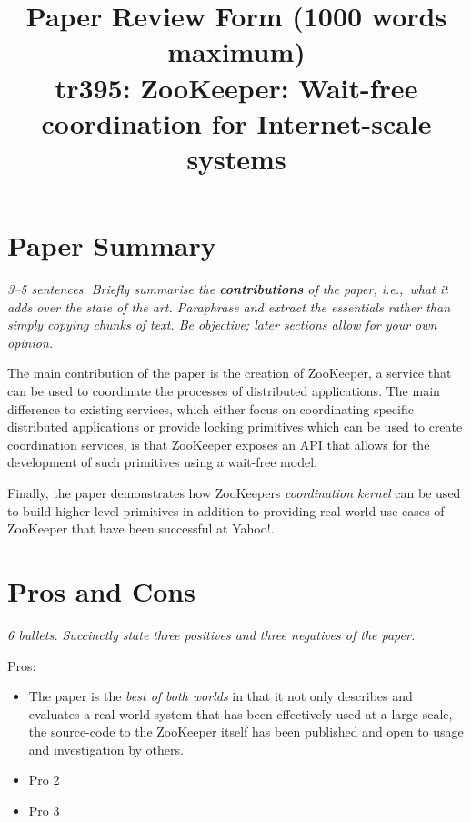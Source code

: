 \documentclass[11pt]{article}
\begin{document}

\title{Paper Review Form (1000 words maximum)\\
    tr395: ZooKeeper: Wait-free coordination for Internet-scale systems \cite{ZooKeeper}}

\maketitle

\section*{Paper Summary}

\textsl{3--5 sentences. Briefly summarise the {\bf contributions} of the paper,
i.e.,~what it adds over the state of the art. Paraphrase and extract the
essentials rather than simply copying chunks of text. Be objective; later
sections allow for your own opinion.}

The main contribution of the paper is the creation of ZooKeeper, a service that
can be used to coordinate the processes of distributed applications. The main
difference to existing services, which either focus on coordinating specific
distributed applications or provide locking primitives which can be used to
create coordination services, is that ZooKeeper exposes an API that allows for
the development of such primitives using a wait-free model.

Finally, the paper demonstrates how ZooKeepers \textit{coordination kernel} can
be used to build higher level primitives in addition to providing real-world
use cases of ZooKeeper that have been successful at Yahoo!.

\section*{Pros and Cons}

\textsl{6 bullets. Succinctly state three positives and three negatives of the
paper.}

Pros:

\begin{itemize}

    \item The paper is the \textit{best of both worlds} in that it not only
    describes and evaluates a real-world system that has been effectively used
    at a large scale, the source-code to the ZooKeeper itself has been
    published and open to usage and investigation by others.

    \item Pro 2

    \item Pro 3

\end{itemize}
\end{document}
